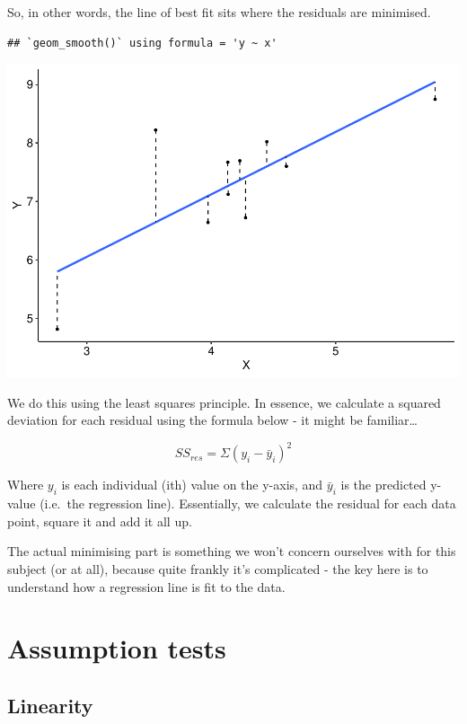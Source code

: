\documentclass[
]{book}
\begin{document}
So, in other words, the line of best fit sits where the residuals are minimised.

\begin{verbatim}
## `geom_smooth()` using formula = 'y ~ x'
\end{verbatim}

\begin{center}\includegraphics{_main_files/figure-latex/unnamed-chunk-190-1} \end{center}

We do this using the least squares principle. In essence, we calculate a squared deviation for each residual using the formula below - it might be familiar\ldots{}

\[
SS_{res} = \Sigma (y_i - \bar y_i)^2
\]

Where \(y_i\) is each individual (ith) value on the y-axis, and \(\bar y_i\) is the predicted y-value (i.e.~the regression line). Essentially, we calculate the residual for each data point, square it and add it all up.

The actual minimising part is something we won't concern ourselves with for this subject (or at all), because quite frankly it's complicated - the key here is to understand how a regression line is fit to the data.

\hypertarget{assumption-tests}{%
\section{Assumption tests}\label{assumption-tests}}

\hypertarget{linearity}{%
\subsection{Linearity}\label{linearity}}
\end{document}
